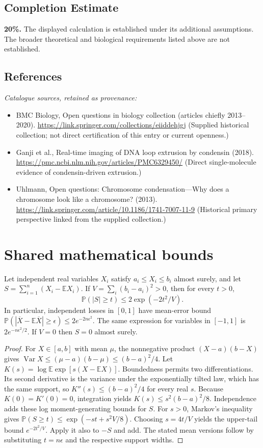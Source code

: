 \documentclass[11pt]{article}
\begin{document}
\subsection{Completion Estimate}
\textbf{20\%.} The displayed calculation is established under its additional assumptions. The broader theoretical and biological requirements listed above are not established.
\subsection{References}
\noindent\emph{Catalogue sources, retained as provenance:}
\begin{itemize}
\item BMC Biology, Open questions in biology collection (articles chiefly 2013--2020). \url{https://link.springer.com/collections/eiiddehjgj} (Supplied historical collection; not direct certification of this entry or current openness.)
\item Ganji et al., Real-time imaging of DNA loop extrusion by condensin (2018). \url{https://pmc.ncbi.nlm.nih.gov/articles/PMC6329450/} (Direct single-molecule evidence of condensin-driven extrusion.)
\item Uhlmann, Open questions: Chromosome condensation---Why does a chromosome look like a chromosome? (2013). \url{https://link.springer.com/article/10.1186/1741-7007-11-9} (Historical primary perspective linked from the supplied collection.)
\end{itemize}




\section{Shared mathematical bounds}\label{app:bounds}
\begin{lemma}\label{lem:bounded}
Let independent real variables $X_i$ satisfy $a_i\leq X_i\leq b_i$ almost surely,
and let $S=\sum_{i=1}^n(X_i-\mathbb{E} X_i)$. If
$V=\sum_i(b_i-a_i)^2>0$, then for every $t>0$,
\[
 \mathbb{P}(|S|\geq t)\leq 2\exp(-2t^2/V).
\]
In particular, independent losses in $[0,1]$ have mean-error bound
$\mathbb{P}(|\overline X-\mathbb{E}\overline X|\geq\epsilon)
\leq2e^{-2n\epsilon^2}$. The same expression for variables in $[-1,1]$
is $2e^{-n\epsilon^2/2}$. If $V=0$ then $S=0$ almost surely.
\end{lemma}
\begin{proof}
For $X\in[a,b]$ with mean $\mu$, the nonnegative product
$(X-a)(b-X)$ gives
$\operatorname{Var} X\leq(\mu-a)(b-\mu)\leq(b-a)^2/4$.
Let $K(s)=\log\mathbb{E}\exp[s(X-\mathbb{E} X)]$.
Boundedness permits two differentiations. Its second derivative is the variance
under the exponentially tilted law, which has the same support, so
$K''(s)\leq(b-a)^2/4$ for every real $s$.
Because $K(0)=K'(0)=0$, integration yields
$K(s)\leq s^2(b-a)^2/8$.
Independence adds these log moment-generating bounds for $S$.
For $s>0$, Markov's inequality gives
$\mathbb{P}(S\geq t)\leq\exp(-st+s^2V/8)$.
Choosing $s=4t/V$ yields the upper-tail bound $e^{-2t^2/V}$.
Apply it also to $-S$ and add. The stated mean versions follow by substituting
$t=n\epsilon$ and the respective support widths.
\end{proof}
\end{document}
